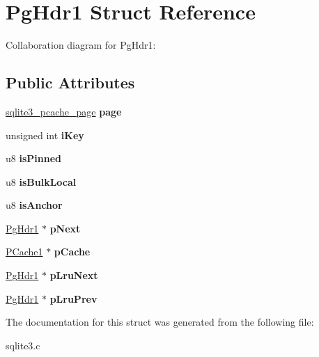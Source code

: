 \hypertarget{structPgHdr1}{}\section{Pg\+Hdr1 Struct Reference}
\label{structPgHdr1}


Collaboration diagram for Pg\+Hdr1\+:
\subsection*{Public Attributes}
\begin{DoxyCompactItemize}
\item 
\hyperlink{structsqlite3__pcache__page}{sqlite3\+\_\+pcache\+\_\+page} {\bfseries page}\hypertarget{structPgHdr1_a121a9abbfea6b112ba77eeb84391ed47}{}\label{structPgHdr1_a121a9abbfea6b112ba77eeb84391ed47}

\item 
unsigned int {\bfseries i\+Key}\hypertarget{structPgHdr1_ad122ef74f5f0137414882aabd111a01b}{}\label{structPgHdr1_ad122ef74f5f0137414882aabd111a01b}

\item 
u8 {\bfseries is\+Pinned}\hypertarget{structPgHdr1_a361946b03e1d4664476d9ea3fce490d9}{}\label{structPgHdr1_a361946b03e1d4664476d9ea3fce490d9}

\item 
u8 {\bfseries is\+Bulk\+Local}\hypertarget{structPgHdr1_a1c07bb6fab410b7c9f41b24c44a118de}{}\label{structPgHdr1_a1c07bb6fab410b7c9f41b24c44a118de}

\item 
u8 {\bfseries is\+Anchor}\hypertarget{structPgHdr1_a232f677ac68bc8fbb7685e8a1955c810}{}\label{structPgHdr1_a232f677ac68bc8fbb7685e8a1955c810}

\item 
\hyperlink{structPgHdr1}{Pg\+Hdr1} $\ast$ {\bfseries p\+Next}\hypertarget{structPgHdr1_acde43ab0ed0fbba33e526058d9c343b9}{}\label{structPgHdr1_acde43ab0ed0fbba33e526058d9c343b9}

\item 
\hyperlink{structPCache1}{P\+Cache1} $\ast$ {\bfseries p\+Cache}\hypertarget{structPgHdr1_aa5b23de466773e72e1b6edf07b3a4570}{}\label{structPgHdr1_aa5b23de466773e72e1b6edf07b3a4570}

\item 
\hyperlink{structPgHdr1}{Pg\+Hdr1} $\ast$ {\bfseries p\+Lru\+Next}\hypertarget{structPgHdr1_ae22cfc3a39fe029a8f8fdd70e7ca4055}{}\label{structPgHdr1_ae22cfc3a39fe029a8f8fdd70e7ca4055}

\item 
\hyperlink{structPgHdr1}{Pg\+Hdr1} $\ast$ {\bfseries p\+Lru\+Prev}\hypertarget{structPgHdr1_adf220ef63d6ceb782ac87a08aeb1722d}{}\label{structPgHdr1_adf220ef63d6ceb782ac87a08aeb1722d}

\end{DoxyCompactItemize}


The documentation for this struct was generated from the following file\+:\begin{DoxyCompactItemize}
\item 
sqlite3.\+c\end{DoxyCompactItemize}
